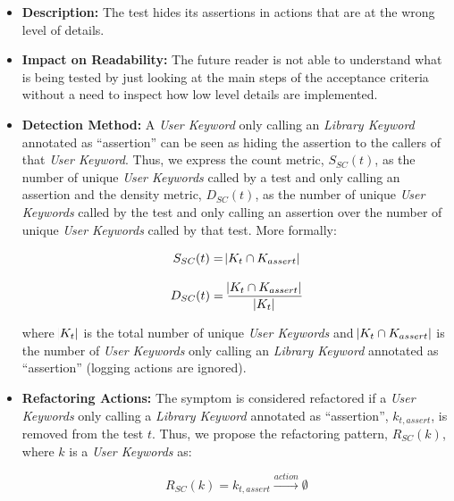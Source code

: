 \begin{itemize}
    \item \textbf{Description:} The test hides its assertions in actions that are at the wrong level of details.

    \item \textbf{Impact on Readability:} The future reader is not able to understand what is being tested by just looking at the main steps of the acceptance criteria without a need to inspect how low level details are implemented.
    
    \item \textbf{Detection Method:} A \emph{User Keyword} only calling an \emph{Library Keyword} annotated as ``assertion'' can be seen as hiding the assertion to the callers of that \emph{User Keyword}. Thus, we express the count metric, $S_{SC}(t)$, as the number of unique \emph{User Keywords} called by a test and only calling an assertion and the density metric, $D_{SC}(t)$, as the number of unique \emph{User Keywords} called by the test and only calling an assertion over the number of unique \emph{User Keywords} called by that test. More formally:
    
    \begin{equation*}
        S_{SC}(t) = \abs{K_{t} \cap K_{assert}}
    \end{equation*}
    
    \begin{equation*}
        D_{SC}(t) = \frac{\abs{K_{t} \cap K_{assert}}}{\abs{K_{t}}}
    \end{equation*}
    
    where $\abs{K_{t}}$ is the total number of unique \emph{User Keywords} and $\abs{K_{t} \cap K_{assert}}$ is the number of \emph{User Keywords} only calling an \emph{Library Keyword} annotated as ``assertion'' (logging actions are ignored).
    
    \item \textbf{Refactoring Actions:} The symptom is considered refactored if a \emph{User Keywords} only calling a \emph{Library Keyword} annotated as ``assertion'', $k_{t, assert}$, is removed from the test $t$. Thus, we propose the refactoring pattern, $R_{SC}(k)$, where $k$ is a \emph{User Keywords} as:
    
    \begin{equation*}
        R_{SC}(k) = k_{t, assert} \xrightarrow{action} \emptyset
    \end{equation*}
\end{itemize}

